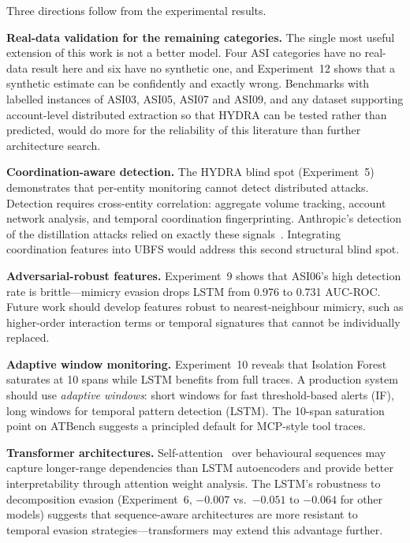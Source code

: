 \documentclass[conference]{IEEEtran}
\begin{document}
Three directions follow from the experimental results.

\textbf{Real-data validation for the remaining categories.} The single most useful extension of this work is not a better model. Four ASI categories have no real-data result here and six have no synthetic one, and Experiment~12 shows that a synthetic estimate can be confidently and exactly wrong. Benchmarks with labelled instances of ASI03, ASI05, ASI07 and ASI09, and any dataset supporting account-level distributed extraction so that HYDRA can be tested rather than predicted, would do more for the reliability of this literature than further architecture search.

\textbf{Coordination-aware detection.} The HYDRA blind spot (Experiment~5) demonstrates that per-entity monitoring cannot detect distributed attacks. Detection requires cross-entity correlation: aggregate volume tracking, account network analysis, and temporal coordination fingerprinting. Anthropic's detection of the distillation attacks relied on exactly these signals~\cite{anthropic2026distillation}. Integrating coordination features into UBFS would address this second structural blind spot.

\textbf{Adversarial-robust features.} Experiment~9 shows that ASI06's high detection rate is brittle---mimicry evasion drops LSTM from 0.976 to 0.731 AUC-ROC. Future work should develop features robust to nearest-neighbour mimicry, such as higher-order interaction terms or temporal signatures that cannot be individually replaced.

\textbf{Adaptive window monitoring.} Experiment~10 reveals that Isolation Forest saturates at 10 spans while LSTM benefits from full traces. A production system should use \textit{adaptive windows}: short windows for fast threshold-based alerts (IF), long windows for temporal pattern detection (LSTM). The 10-span saturation point on ATBench suggests a principled default for MCP-style tool traces.

\textbf{Transformer architectures.} Self-attention~\cite{vaswani2017attention} over behavioural sequences may capture longer-range dependencies than LSTM autoencoders and provide better interpretability through attention weight analysis. The LSTM's robustness to decomposition evasion (Experiment~6, $-0.007$ vs.\ $-0.051$ to $-0.064$ for other models) suggests that sequence-aware architectures are more resistant to temporal evasion strategies---transformers may extend this advantage further.

\end{document}
